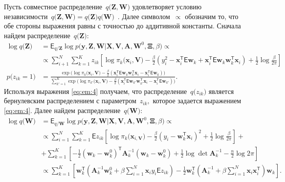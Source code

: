 Пусть совместное распределение~$q\bigr(\mathbf{Z}, \mathbf{W}\bigr)$ удовлетворяет условию независимости~$q\bigr(\mathbf{Z}, \mathbf{W}\bigr) = q\bigr(\mathbf{Z}\bigr)q\bigr(\mathbf{W}\bigr)$~\cite{bishop2006}. 
Далее символом~$\propto$ обозначим то, что обе стороны выражения равны с точностью до аддитивной константы.
Сначала найдем распределение~$q\bigr(\textbf{Z}\bigr)$:
\[
\label{eq:em:4}
\begin{aligned}
\log q\bigr(\textbf{Z}\bigr) &= \mathsf{E}_{q/\textbf{Z}} \log p\bigr(\mathbf{y}, \mathbf{Z}, \mathbf{W}|\mathbf{X}, \mathbf{V}, \textbf{A}, \textbf{W}^{0}, \bm{\Xi}, \beta\bigr)  \propto\\
&\propto \sum_{i+1}^{N}\sum_{k=1}^{K}z_{ik}\left[\log\pi_{k}\bigr(\textbf{x}_{i}, \textbf{V}\bigr) - \frac{\beta}{2}\left(y_{i}^{2} -\textbf{x}_{i}^{\mathsf{T}}\mathsf{E}\textbf{w}_{k} + \textbf{x}_{i}^{\mathsf{T}}\mathsf{E}\textbf{w}_{k}\textbf{w}_{k}^{\mathsf{T}}\textbf{x}_{i}\right) + \frac{1}{2}\log\frac{\beta}{2\pi}\right]\\
p\bigr(z_{ik} = 1\bigr) &= \frac{\exp\bigr(\log\pi_{k}\bigr(\textbf{x}_{i}, \textbf{V}\bigr) - \frac{\beta}{2}\left(\textbf{x}_{i}^{\mathsf{T}}\mathsf{E}\textbf{w}_{k}\textbf{w}_{k}^{\mathsf{T}}\textbf{x}_{i} - \textbf{x}_{i}^{\mathsf{T}}\mathsf{E}\textbf{w}_{k}\right)\bigr)}{\sum_{k'=1}^{K}\exp\bigr(\log\pi_{k'}\bigr(\textbf{x}_{i}, \textbf{V}\bigr) - \frac{\beta}{2}\left(\textbf{x}_{i}^{\mathsf{T}}\mathsf{E}\textbf{w}_{k'}\textbf{w}_{k'}^{\mathsf{T}}\textbf{x}_{i} - \textbf{x}_{i}^{\mathsf{T}}\mathsf{E}\textbf{w}_{k'}\right)\bigr)}.
\end{aligned}
\]
Используя выражения \eqref{eq:em:4} получаем, что распределение~$q\bigr(z_{ik}\bigr)$ является бернулевским распределением с параметром~$z_{ik},$ которое задается выражением \eqref{eq:em:4}.
Далее найдем распределение~$q\bigr(\textbf{W}\bigr)$:
\[
\label{eq:em:5}
\begin{aligned}
\log q\bigr(\textbf{W}\bigr) &= \mathsf{E}_{q/\textbf{W}}\log p\bigr(\mathbf{y}, \mathbf{Z}, \mathbf{W}|\mathbf{X}, \mathbf{V}, \textbf{A}, \textbf{W}^{0}, \bm{\Xi}, \beta\bigr) \propto\\
&\propto \sum_{i=1}^{N}\sum_{k=1}^{K}\mathsf{E}z_{ik}\left[\log\pi_{k}\bigr(\textbf{x}_{i, \textbf{V}}\bigr) - \frac{\beta}{2}\left(y_{i} - \textbf{w}_{k}^{\mathsf{T}}\textbf{x}_{i}\right)^{2} + \frac{1}{2}\log\frac{\beta}{2\pi}\right] + \\
&+ \sum_{k=1}^{K}\left[-\frac{1}{2}\left(\textbf{w}_{k} - \textbf{w}_{k}^{0}\right)^{\mathsf{T}}\textbf{A}_{k}^{-1}\left(\textbf{w}_{k} - \textbf{w}_{k}^{0}\right) + \frac{1}{2}\log\det\textbf{A}^{-1}_{k} - \frac{n}{2}\log2\pi\right] \\
&\propto \sum_{k=1}^{K}\left[\textbf{w}_{k}^{\mathsf{T}}\left(\textbf{A}_{k}^{-1}\textbf{w}_{k}^{0}+\beta\sum_{i=1}^{N}\textbf{x}_{i}y_{i}\mathsf{E}z_{ik}\right)-\frac{1}{2}\textbf{w}_{k}^{\mathsf{T}}\left(\textbf{A}_{k}^{-1}+\beta\sum_{i=1}^{N}\textbf{x}_{i}\textbf{x}_{i}^{\mathsf{T}}\right)\textbf{w}_{k}\right].
\end{aligned}
\]

